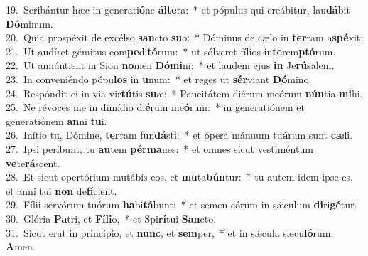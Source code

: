 {19.~}Scribántur hæc in generati\textbf{ó}ne \textbf{ál}\textbf{te}ra:~* et pópulus qui creábitur, lau\textbf{dá}bit \textbf{Dó}minum.\\
{20.~}Quia prospéxit de excélso \textbf{san}cto \textbf{su}o:~* Dóminus de cælo in \textbf{ter}ram a\textbf{spé}xit:\\
{21.~}Ut audíret gémitus com\textbf{pe}di\textbf{tó}rum:~* ut sólveret fílios in\textbf{te}rem\textbf{ptó}rum.\\
{22.~}Ut annúntient in Sion \textbf{no}men \textbf{Dó}\textbf{mi}ni:~* et laudem ejus \textbf{in} Je\textbf{rú}salem.\\
{23.~}In conveniéndo pópu\textbf{los} in \textbf{u}num:~* et reges ut \textbf{sér}viant \textbf{Dó}mino.\\
{24.~}Respóndit ei in via vir\textbf{tú}tis \textbf{su}æ:~* Paucitátem diérum meórum \textbf{nún}tia \textbf{mi}hi.\\
{25.~}Ne révoces me in dimídio di\textbf{é}rum me\textbf{ó}rum:~* in generatiónem et generatiónem \textbf{an}ni \textbf{tu}i.\\
{26.~}Inítio tu, Dómine, \textbf{ter}ram fun\textbf{dá}sti:~* et ópera mánuum tu\textbf{á}rum sunt \textbf{cæ}li.\\
{27.~}Ipsi períbunt, tu \textbf{au}tem \textbf{pér}\textbf{ma}nes:~* et omnes sicut vestiméntum \textbf{ve}te\textbf{rá}scent.\\
{28.~}Et sicut opertórium mutábis eos, et \textbf{mu}ta\textbf{bún}tur:~* tu autem idem ipse es, et anni tui \textbf{non} de\textbf{fí}cient.\\
{29.~}Fílii servórum tuórum \textbf{ha}bi\textbf{tá}bunt:~* et semen eórum in sǽculum \textbf{di}ri\textbf{gé}tur.\\
{30.~}Glória \textbf{Pa}tri, et \textbf{Fí}\textbf{li}o,~* et Spi\textbf{rí}tui \textbf{San}cto.\\
{31.~}Sicut erat in princípio, et \textbf{nunc}, et \textbf{sem}per,~* et in sǽcula sæcu\textbf{ló}rum. \textbf{A}men.\\
